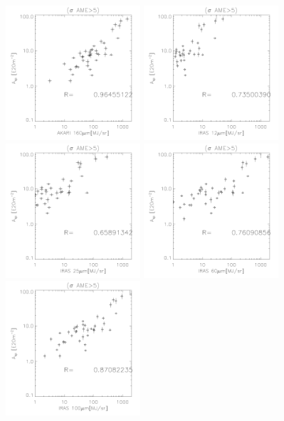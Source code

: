 \begin{figure}[!htb]
  \includegraphics[width=50mm]{IRIntMWAmp/akari160_Asp_sp.pdf}
  \includegraphics[width=50mm]{IRIntMWAmp/iras12_Asp_sp.pdf}
  \includegraphics[width=50mm]{IRIntMWAmp/iras25_Asp_sp.pdf}
  \includegraphics[width=50mm]{IRIntMWAmp/iras60_Asp_sp.pdf}
  \includegraphics[width=50mm]{IRIntMWAmp/iras100_Asp_sp.pdf}

\end{figure}
